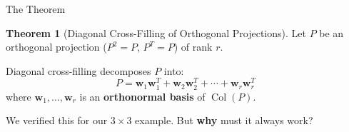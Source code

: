 \documentclass[10pt]{beamer}
\theoremstyle{definition}
\newtheorem{thm}{Theorem}[section]
\newcommand{\x}[1]{\alert{\textbf{#1}}}
\begin{document}
\begin{frame}{The Theorem}

\begin{thm}[Diagonal Cross-Filling of Orthogonal Projections]
Let $P$ be an orthogonal projection ($P^2 = P$, $P^T = P$) of rank $r$.

Diagonal cross-filling decomposes $P$ into:
$$P = \mathbf{w}_1\mathbf{w}_1^T + \mathbf{w}_2\mathbf{w}_2^T + \cdots + \mathbf{w}_r\mathbf{w}_r^T$$
where $\mathbf{w}_1, \ldots, \mathbf{w}_r$ is an \x{orthonormal basis} of $\operatorname{Col}(P)$.
\end{thm}

\vspace{1em}

We verified this for our $3 \times 3$ example. But \x{why} must it always work?

\end{frame}
\end{document}
